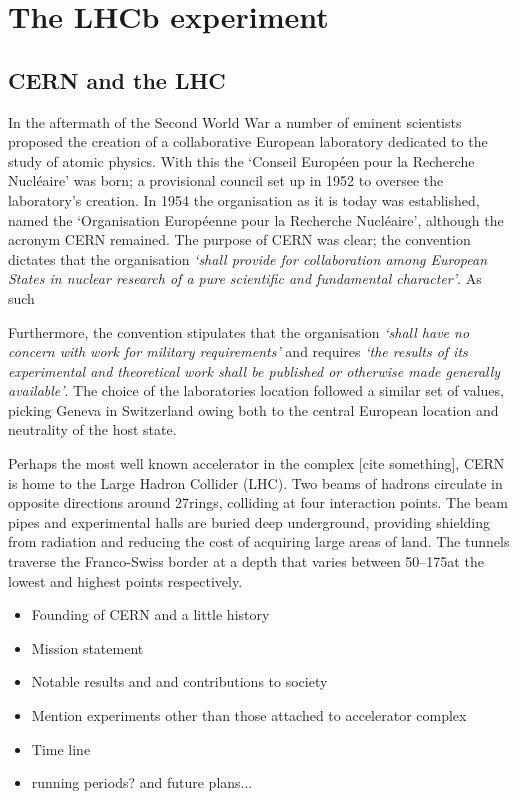 \chapter{The LHCb experiment} 
\label{ch:detector}
\minitoc
 


\section{CERN and the LHC}


In the aftermath of the Second World War a number of eminent scientists proposed the creation of a collaborative European laboratory dedicated to the study of atomic physics. With this the `Conseil Europ\'een pour la Recherche Nucl\'eaire' was born; a provisional council set up in 1952 to oversee the laboratory's creation.  In 1954 the organisation as it is today was established, named the `Organisation Europ\'eenne pour la Recherche Nucl\'eaire', although the acronym CERN remained. 
The purpose of CERN was clear; the convention dictates that the organisation \emph{`shall provide for collaboration among European States in nuclear research of a pure scientific and fundamental character'}.
As such 

Furthermore, the convention stipulates that the organisation \emph{`shall have no concern with work for military requirements'} and  
requires \emph{`the results of its experimental and theoretical work shall be published or otherwise made generally available'}. 
The choice of the laboratories location followed a similar set of values, picking Geneva in Switzerland owing both to the central European location and neutrality of the host state. 


Perhaps the most well known accelerator in the complex [cite something], CERN is home to the Large Hadron Collider (LHC). Two beams of hadrons circulate in opposite directions around 27\km rings, colliding at four interaction points. The beam pipes and experimental halls are buried deep underground, providing shielding from radiation and reducing the cost of acquiring large areas of land. The tunnels traverse the Franco-Swiss border at a depth that varies between 50--175\m at the lowest and highest points respectively.      


{\color{Red}
\begin{itemize}
\item Founding of CERN and a little history 
\item Mission statement
\item Notable results and and contributions to society
\item Mention experiments other than those attached to accelerator complex
\item Time line
\item running periods? and future plans...
\end{itemize}
}

